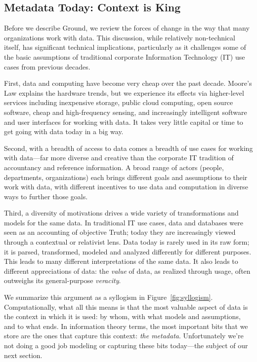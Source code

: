\documentclass[10pt,letterpaper]{article}
\begin{document}
\subsection{Metadata Today: Context is King}

Before we describe Ground, we review the forces of change in the way that many organizations work with data.  This discussion, while relatively non-technical itself, has significant technical implications, particularly as it challenges some of the basic assumptions of traditional corporate Information Technology (IT) use cases from previous decades.

First, data and computing have become very cheap over the past decade. Moore's Law explains the hardware trends, but we experience its effects via higher-level services including inexpensive storage, public cloud computing, open source software, cheap and high-frequency sensing, and increasingly intelligent software and user interfaces for working with data.  It takes very little capital or time to get going with data today in a big way.

Second, with a breadth of access to data comes a breadth of use cases for working with data---far more diverse and creative than the corporate IT tradition of accountancy and reference information.  A broad range of actors (people, departments, organizations) each brings different goals and assumptions to their work with data, with different incentives to use data and computation in diverse ways to further those goals.

Third, a diversity of motivations drives a wide variety of transformations and models for the same data.  In traditional IT use cases, data and databases were seen as an accounting of objective Truth; today they are increasingly viewed through a contextual or relativist lens.  Data today is rarely used in its raw form; it is parsed, transformed, modeled and analyzed differently for different purposes.  This leads to many different interpretations of the same data.  It also leads to different appreciations of data: the \emph{value} of data, as realized through usage, often outweighs its general-purpose \emph{veracity}.

We summarize this argument as a syllogism in Figure~\ref{fig:syllogism}.  Computationally, what all this means is that the most valuable aspect of data is the context in which it is used: by whom, with what models and assumptions, and to what ends.  In information theory terms, the most important bits that we store are the ones that capture this context: \emph{the metadata}.  Unfortunately we're not doing a good job modeling or capturing these bits today---the subject of our next section.
\end{document}
